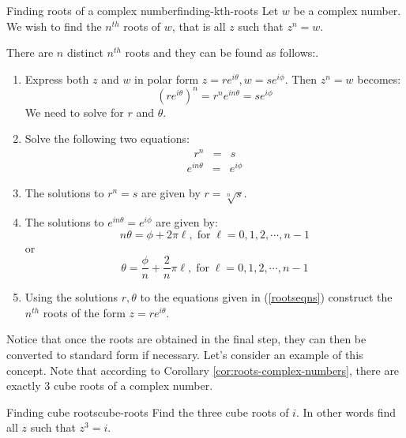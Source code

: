 \begin{procedure}{Finding roots of a complex number}{finding-kth-roots}
Let $w$ be a complex number. We wish to find the $n^{th}$ roots of $w$, that is all $z$ such that $z^n = w$. 

There are $n$ distinct $n^{th}$ roots and they can be found as follows:. 
 
\begin{enumerate}
\item Express both $z$ and $w$ in polar form $z=re^{i\theta}, w=se^{i\phi}$. Then $z^n = w$ becomes:
\[
(re^{i\theta})^n = r^n e^{i n \theta} = se^{i\phi}
\]
We need to solve for $r$ and $\theta$. 
\item Solve the following two equations:
\begin{eqnarray*}
r^n &=& s 
\end{eqnarray*}
\begin{eqnarray}
e^{i n \theta} &=& e^{i \phi}
\label{rootseqns}
\end{eqnarray}
\item The solutions to $r^n = s$ are given by $r = \sqrt[n]{s}$. 

\item The solutions to $e^{i n \theta} = e^{i \phi}$ are given by:
\[
n\theta = \phi + 2\pi \ell,  \; \mbox{for} \; \ell = 0,1,2, \cdots, n-1
\]
or
\[
\theta = \frac{\phi}{n} + \frac{2}{n} \pi \ell, \; \mbox{for} \; \ell = 0,1,2, \cdots, n-1 
\]
\item
Using the solutions $r, \theta$ to the equations given in (\ref{rootseqns})
construct the $n^{th}$ roots of the form $z = re^{i\theta}$.  
\end{enumerate}
\end{procedure}

Notice that once the roots are obtained in the final step, they can then be converted to standard form if necessary. Let's consider an example of this concept. Note that according to Corollary \ref{cor:roots-complex-numbers}, 
there are exactly $3$ cube roots of a complex number.

\begin{example}{Finding cube roots}{cube-roots}
Find the three cube roots of $i.$ In other words find all $z$ such that $z^3 = i$. 
\end{example}

